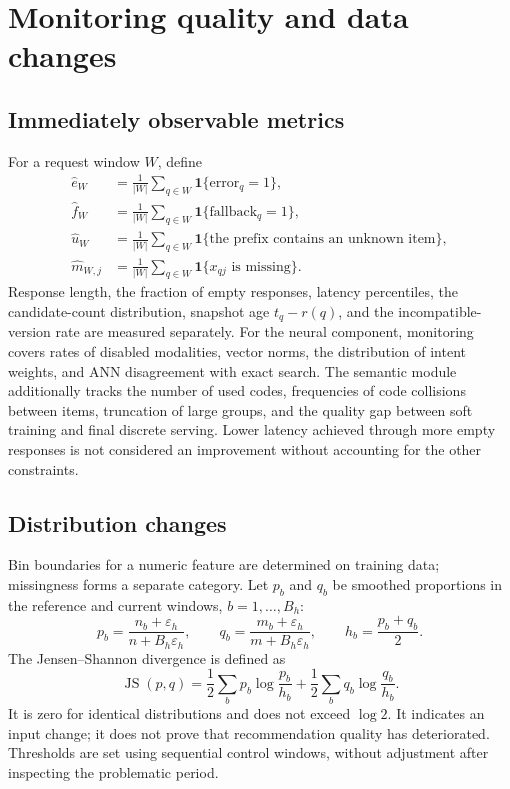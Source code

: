 \documentclass[12pt,a4paper]{article}
\newcommand{\ind}{\mathbf 1}
\newcommand{\eps}{\varepsilon}
\theoremstyle{plainru}
\begin{document}
\section{Monitoring quality and data changes}\label{sec:operations-monitoring}

\subsection{Immediately observable metrics}

For a request window \(W\), define
\begin{align}
\widehat e_W&=\frac1{|W|}\sum_{q\in W}\ind\{\mathrm{error}_q=1\},\\
\widehat f_W&=\frac1{|W|}\sum_{q\in W}\ind\{\mathrm{fallback}_q=1\},\\
\widehat u_W&=\frac1{|W|}\sum_{q\in W}\ind\{\text{the prefix contains an unknown item}\},\\
\widehat m_{W,j}&=\frac1{|W|}\sum_{q\in W}\ind\{x_{qj}\text{ is missing}\}.
\end{align}
Response length, the fraction of empty responses,
latency percentiles, the candidate-count distribution,
snapshot age \(t_q-r(q)\), and the incompatible-version rate are measured separately.
For the neural component, monitoring covers rates of disabled modalities,
vector norms, the distribution of intent weights, and ANN disagreement
with exact search. The semantic module additionally tracks
the number of used codes, frequencies of code collisions between items,
truncation of large groups, and the quality gap between soft training
and final discrete serving.
Lower latency achieved through more empty responses
is not considered an improvement without accounting for the other constraints.

\subsection{Distribution changes}

Bin boundaries for a numeric feature are determined on training
data; missingness forms a separate category. Let \(p_b\) and \(q_b\)
be smoothed proportions in the reference and current windows, \(b=1,\ldots,B_h\):
\begin{equation}\label{eq:ops-hist}
p_b=\frac{n_b+\eps_h}{n+B_h\eps_h},\qquad
q_b=\frac{m_b+\eps_h}{m+B_h\eps_h},\qquad h_b=\frac{p_b+q_b}{2}.
\end{equation}
The Jensen--Shannon divergence is defined as
\begin{equation}\label{eq:ops-js}
\operatorname{JS}(p,q)=\frac12\sum_b p_b\log\frac{p_b}{h_b}
+\frac12\sum_b q_b\log\frac{q_b}{h_b}.
\end{equation}
It is zero for identical distributions and does not exceed
\(\log2\). It indicates an input change; it does not prove
that recommendation quality has deteriorated. Thresholds are set using sequential
control windows, without adjustment after inspecting the problematic period.
\end{document}

